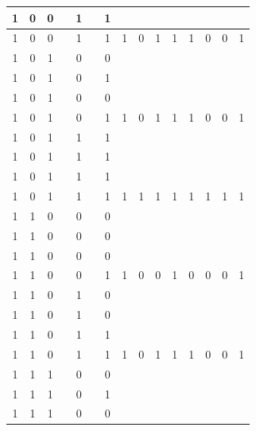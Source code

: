 \begin{table}[!tb]
\begin{tabular}{|c|c|c|c|c|c|c|c|c|c|c|c|c|c|c|}
        \rowcolor{yellow!40} 1 & 0 & 0 &  & 1 &  & 1 &  &  &  &  &  &  &  &  \\ \hline
        \rowcolor{yellow!40} 1 & 0 & 0 &  & 1 &  & 1 & 1 & 0 & 1 & 1 & 1 & 0 & 0 & 1 \\ \hline
        \rowcolor{gray!40} 1 & 0 & 1 &  & 0 &  & 0 &  &  &  &  &  &  &  &  \\ \hline
        \rowcolor{gray!40} 1 & 0 & 1 &  & 0 &  & 1 &  &  &  &  &  &  &  &  \\ \hline
        \rowcolor{gray!40} 1 & 0 & 1 &  & 0 &  & 0 &  &  &  &  &  &  &  &  \\ \hline
        \rowcolor{gray!40} 1 & 0 & 1 &  & 0 &  & 1 & 1 & 0 & 1 & 1 & 1 & 0 & 0 & 1 \\ \hline
        \rowcolor{blue!40} 1 & 0 & 1 &  & 1 &  & 1 &  &  &  &  &  &  &  &  \\ \hline
        \rowcolor{blue!40} 1 & 0 & 1 &  & 1 &  & 1 &  &  &  &  &  &  &  &  \\ \hline
        \rowcolor{blue!40} 1 & 0 & 1 &  & 1 &  & 1 &  &  &  &  &  &  &  &  \\ \hline
        \rowcolor{blue!40} 1 & 0 & 1 &  & 1 &  & 1 & 1 & 1 & 1 & 1 & 1 & 1 & 1 & 1 \\ \hline
        \rowcolor{red!40} 1 & 1 & 0 &  & 0 &  & 0 &  &  &  &  &  &  &  &  \\ \hline
        \rowcolor{red!40} 1 & 1 & 0 &  & 0 &  & 0 &  &  &  &  &  &  &  &  \\ \hline
        \rowcolor{red!40} 1 & 1 & 0 &  & 0 &  & 0 &  &  &  &  &  &  &  &  \\ \hline
        \rowcolor{red!40} 1 & 1 & 0 &  & 0 &  & 1 & 1 & 0 & 0 & 1 & 0 & 0 & 0 & 1 \\ \hline
        \rowcolor{green!40} 1 & 1 & 0 &  & 1 &  & 0 &  &  &  &  &  &  &  &  \\ \hline
        \rowcolor{green!40} 1 & 1 & 0 &  & 1 &  & 0 &  &  &  &  &  &  &  &  \\ \hline
        \rowcolor{green!40} 1 & 1 & 0 &  & 1 &  & 1 &  &  &  &  &  &  &  &  \\ \hline
        \rowcolor{green!40} 1 & 1 & 0 &  & 1 &  & 1 & 1 & 0 & 1 & 1 & 1 & 0 & 0 & 1 \\ \hline
        \rowcolor{yellow!40} 1 & 1 & 1 &  & 0 &  & 0 &  &  &  &  &  &  &  &  \\ \hline
        \rowcolor{yellow!40} 1 & 1 & 1 &  & 0 &  & 1 &  &  &  &  &  &  &  &  \\ \hline
        \rowcolor{yellow!40} 1 & 1 & 1 &  & 0 &  & 0 &  &  &  &  &  &  &  &  \\ \hline

\end{tabular}
\end{table}
